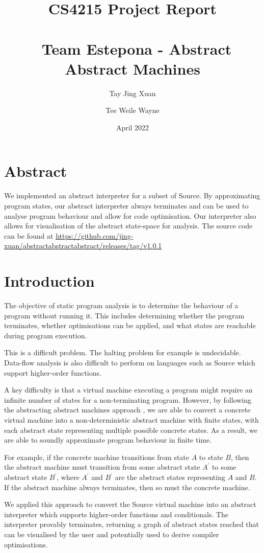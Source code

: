 \documentclass[12pt]{article}
\title{CS4215 Project Report \\\ \\\
Team Estepona - Abstract Abstract Machines}
\author{Tay Jing Xuan \and Tee Weile Wayne}
\date{April 2022}
\begin{document}
\maketitle

\section{Abstract}
We implemented an abstract interpreter for a subset of Source. By approximating program states, our abstract interpreter always terminates and can be used to analyse program behaviour and allow for code optimisation. Our interpreter also allows for visualisation of the abstract state-space for analysis. The source code can be found at \url{https://github.com/jing-xuan/abstractabstractabstract/releases/tag/v1.0.1}

\section{Introduction}
The objective of static program analysis is to determine the behaviour of a program without running it. This includes determining whether the program terminates, whether optimisations can be applied, and what states are reachable during program execution.

This is a difficult problem. The halting problem for example is undecidable. Data-flow analysis is also difficult to perform on languages such as Source which support higher-order functions.

A key difficulty is that a virtual machine executing a program might require an infinite number of states for a non-terminating program. However, by following the abstracting abstract machines approach \cite{aam}, we are able to convert a concrete virtual machine into a non-deterministic abstract machine with finite states, with each abstract state representing multiple possible concrete states. As a result, we are able to soundly approximate program behaviour in finite time.

For example, if the concrete machine transitions from state $A$ to state $B$, then the abstract machine must transition from some abstract state $A^{\prime}$ to some abstract state $B^{\prime}$, where $A^{\prime}$ and $B^{\prime}$ are the abstract states representing $A$ and $B$. If the abstract machine always terminates, then so must the concrete machine.

We applied this approach to convert the Source virtual machine into an abstract interpreter which supports higher-order functions and conditionals. The interpreter provably terminates, returning a graph of abstract states reached that can be visualised by the user and potentially used to derive compiler optimisations.
\end{document}
